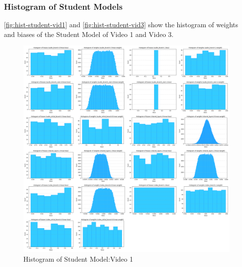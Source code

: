     \pagebreak

    \subsubsection{Histogram of Student Models}
    \autoref{fig:hist-student-vid1} and \autoref{fig:hist-student-vid3} show the histogram of weights and biases of the Student Model of Video 1 and Video 3.

    \begin{figure}[H]
        \centering
        \includegraphics[width=\linewidth]{assets/quantization/histogram/histogram_vvsa_student.png}
        \caption{Histogram of Student Model:Video 1}
        \label{fig:hist-student-vid1}
    \end{figure}


